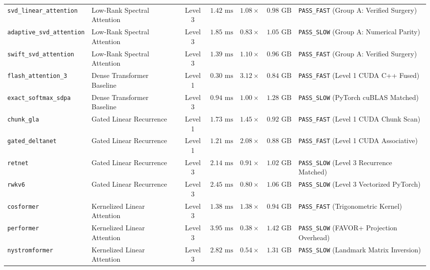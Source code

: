 \begin{table}[t]
\begin{tabular}{l l c c c c l}
\midrule
\texttt{svd\_linear\_attention}     & Low-Rank Spectral Attention & Level 3 & $1.42\text{ ms}$ & $1.08\times$ & $0.98\text{ GB}$ & \texttt{PASS\_FAST} (Group A: Verified Surgery) \\
\texttt{adaptive\_svd\_attention}   & Low-Rank Spectral Attention & Level 3 & $1.85\text{ ms}$ & $0.83\times$ & $1.05\text{ GB}$ & \texttt{PASS\_SLOW} (Group A: Numerical Parity) \\
\texttt{swift\_svd\_attention}      & Low-Rank Spectral Attention & Level 3 & $1.39\text{ ms}$ & $1.10\times$ & $0.96\text{ GB}$ & \texttt{PASS\_FAST} (Group A: Verified Surgery) \\
\midrule
\texttt{flash\_attention\_3}        & Dense Transformer Baseline & Level 1 & $0.30\text{ ms}$ & $3.12\times$ & $0.84\text{ GB}$ & \texttt{PASS\_FAST} (Level 1 CUDA C++ Fused) \\
\texttt{exact\_softmax\_sdpa}       & Dense Transformer Baseline & Level 3 & $0.94\text{ ms}$ & $1.00\times$ & $1.28\text{ GB}$ & \texttt{PASS\_SLOW} (PyTorch cuBLAS Matched) \\
\midrule
\texttt{chunk\_gla}                 & Gated Linear Recurrence & Level 1 & $1.73\text{ ms}$ & $1.45\times$ & $0.92\text{ GB}$ & \texttt{PASS\_FAST} (Level 1 CUDA Chunk Scan) \\
\texttt{gated\_deltanet}            & Gated Linear Recurrence & Level 1 & $1.21\text{ ms}$ & $2.08\times$ & $0.88\text{ GB}$ & \texttt{PASS\_FAST} (Level 1 CUDA Associative) \\
\texttt{retnet}                     & Gated Linear Recurrence & Level 3 & $2.14\text{ ms}$ & $0.91\times$ & $1.02\text{ GB}$ & \texttt{PASS\_SLOW} (Level 3 Recurrence Matched) \\
\texttt{rwkv6}                      & Gated Linear Recurrence & Level 3 & $2.45\text{ ms}$ & $0.80\times$ & $1.06\text{ GB}$ & \texttt{PASS\_SLOW} (Level 3 Vectorized PyTorch) \\
\midrule
\texttt{cosformer}                  & Kernelized Linear Attention & Level 3 & $1.38\text{ ms}$ & $1.38\times$ & $0.94\text{ GB}$ & \texttt{PASS\_FAST} (Trigonometric Kernel) \\
\texttt{performer}                  & Kernelized Linear Attention & Level 3 & $3.95\text{ ms}$ & $0.38\times$ & $1.42\text{ GB}$ & \texttt{PASS\_SLOW} (FAVOR+ Projection Overhead) \\
\texttt{nystromformer}              & Kernelized Linear Attention & Level 3 & $2.82\text{ ms}$ & $0.54\times$ & $1.31\text{ GB}$ & \texttt{PASS\_SLOW} (Landmark Matrix Inversion) \\

\end{tabular}
\end{table}
